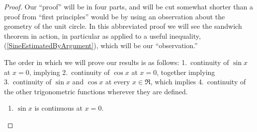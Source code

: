 \begin{proof}
Our ``proof'' will be in four parts, and will be
cut somewhat shorter than a proof from ``first principles''
would be by using an observation
about the geometry of the unit circle.
In this abbreviated proof we will see
the sandwich theorem in action, in particular as applied
to a useful inequality, 
(\ref{SineEstimatedByArgument}),  which will be our ``observation.'' 

The order in which we will prove our results is as follows:
1.\ continuity of $\sin x$ at $x=0$, implying 2.\ continuity of $\cos x$ at
$x=0$, together implying 3.\ continuity of $\sin x$ and $\cos x$ at every 
$x\in\Re$, which implies
4.\ continuity of the other trigonometric functions 
wherever they are defined.

\begin{enumerate}
\item $\sin x$ is continuous at $x=0$.


\end{enumerate}
\end{proof}

